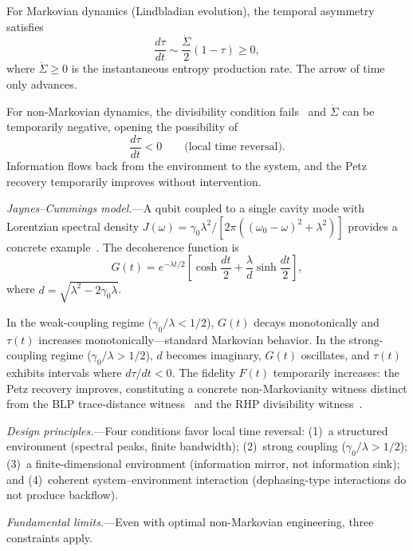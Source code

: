 \documentclass[prl,twocolumn,superscriptaddress,longbibliography,floatfix]{revtex4-2}
\newcommand{\tauasym}{\tau}
\begin{document}
For Markovian dynamics (Lindbladian evolution), the temporal asymmetry
satisfies~\cite{Huang2026a}
\begin{equation}
\frac{d\tauasym}{dt}
\sim \frac{\dot{\Sigma}}{2}(1 - \tauasym) \geq 0,
\label{eq:markov_mono}
\end{equation}
where $\dot{\Sigma} \geq 0$ is the instantaneous entropy production
rate.  The arrow of time only advances.

For non-Markovian dynamics, the divisibility condition
fails~\cite{Breuer2016} and $\dot{\Sigma}$ can be temporarily
negative, opening the possibility of
\begin{equation}
\frac{d\tauasym}{dt} < 0
\qquad \text{(local time reversal)}.
\label{eq:nonmarkov}
\end{equation}
Information flows back from the environment to the system, and the
Petz recovery temporarily improves without intervention.

\emph{Jaynes--Cummings model.}---A qubit coupled to a single cavity
mode with Lorentzian spectral density
$J(\omega) = \gamma_0 \lambda^2 /
[2\pi((\omega_0 - \omega)^2 + \lambda^2)]$
provides a concrete example~\cite{Breuer2009}.  The decoherence
function is
\begin{equation}
G(t) = e^{-\lambda t/2}
\!\left[\cosh\!\frac{dt}{2}
+ \frac{\lambda}{d}\sinh\!\frac{dt}{2}\right]\!,
\label{eq:decoherence}
\end{equation}
where $d = \sqrt{\lambda^2 - 2\gamma_0\lambda}$.

In the weak-coupling regime ($\gamma_0/\lambda < 1/2$), $G(t)$ decays
monotonically and $\tauasym(t)$ increases monotonically---standard
Markovian behavior.  In the strong-coupling regime
($\gamma_0/\lambda > 1/2$), $d$ becomes imaginary, $G(t)$ oscillates,
and $\tauasym(t)$ exhibits intervals where
$d\tauasym/dt < 0$.  The fidelity $F(t)$ temporarily increases:
the Petz recovery improves, constituting a concrete
non-Markovianity witness distinct from the BLP trace-distance
witness~\cite{Breuer2009} and the RHP divisibility
witness~\cite{Rivas2010}.

\emph{Design principles.}---Four conditions favor local time reversal:
(1)~a structured environment (spectral peaks, finite bandwidth);
(2)~strong coupling ($\gamma_0/\lambda > 1/2$);
(3)~a finite-dimensional environment (information mirror, not
information sink); and (4)~coherent system--environment interaction
(dephasing-type interactions do not produce backflow).

\emph{Fundamental limits.}---Even with optimal non-Markovian
engineering, three constraints apply.
\end{document}
